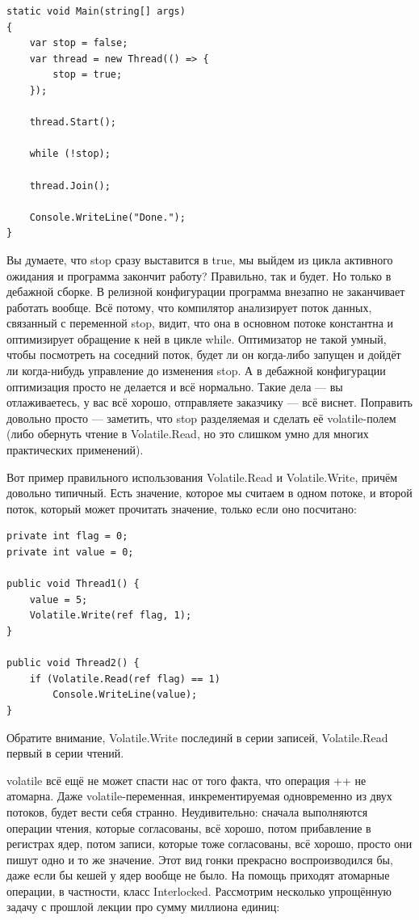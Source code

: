\documentclass[a5paper]{article}
\begin{document}
\begin{verbatim}
static void Main(string[] args)
{
    var stop = false;
    var thread = new Thread(() => {
        stop = true;
    });

    thread.Start();

    while (!stop);

    thread.Join();

    Console.WriteLine("Done.");
}
\end{verbatim}

Вы думаете, что stop сразу выставится в true, мы выйдем из цикла активного ожидания и программа закончит работу? Правильно, так и будет. Но только в дебажной сборке. В релизной конфигурации программа внезапно не заканчивает работать вообще. Всё потому, что компилятор анализирует поток данных, связанный с переменной stop, видит, что она в основном потоке константна и оптимизирует обращение к ней в цикле while. Оптимизатор не такой умный, чтобы посмотреть на соседний поток, будет ли он когда-либо запущен и дойдёт ли когда-нибудь управление до изменения stop. А в дебажной конфигурации оптимизация просто не делается и всё нормально. Такие дела --- вы отлаживаетесь, у вас всё хорошо, отправляете заказчику --- всё виснет. Поправить довольно просто --- заметить, что stop разделяемая и сделать её volatile-полем (либо обернуть чтение в Volatile.Read, но это слишком умно для многих практических применений).

Вот пример правильного использования Volatile.Read и Volatile.Write, причём довольно типичный. Есть значение, которое мы считаем в одном потоке, и второй поток, который может прочитать значение, только если оно посчитано:

\begin{verbatim}
private int flag = 0;
private int value = 0;

public void Thread1() {
    value = 5;
    Volatile.Write(ref flag, 1);
}

public void Thread2() {
    if (Volatile.Read(ref flag) == 1)
        Console.WriteLine(value);
}
\end{verbatim}

Обратите внимание, Volatile.Write послединй в серии записей, Volatile.Read первый в серии чтений.

volatile всё ещё не может спасти нас от того факта, что операция ++ не атомарна. Даже volatile-переменная, инкрементируемая одновременно из двух потоков, будет вести себя странно. Неудивительно: сначала выполняются операции чтения, которые согласованы, всё хорошо, потом прибавление в регистрах ядер, потом записи, которые тоже согласованы, всё хорошо, просто они пишут одно и то же значение. Этот вид гонки прекрасно воспроизводился бы, даже если бы кешей у ядер вообще не было. На помощь приходят атомарные операции, в частности, класс Interlocked. Рассмотрим несколько упрощённую задачу с прошлой лекции про сумму миллиона единиц:
\end{document}
